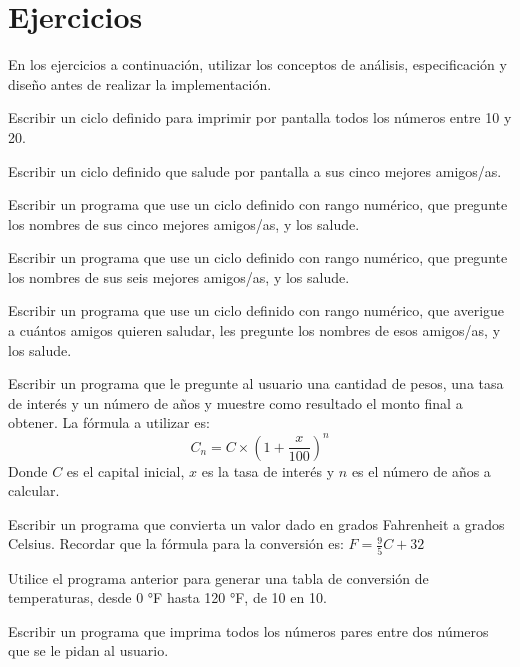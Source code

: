 \newpage
\section{Ejercicios}
En los ejercicios a continuación, utilizar los conceptos de análisis,
especificación y diseño antes de realizar la implementación.

\begin{partes}
	\item Escribir un ciclo definido para imprimir por pantalla
todos los números entre 10 y 20.
	\item Escribir un ciclo definido que salude por pantalla a
sus cinco mejores amigos/as.
	\item Escribir un programa que use un ciclo definido con
rango numérico, que pregunte los nombres de sus cinco mejores
amigos/as, y los salude.
	\item Escribir un programa que use un ciclo definido con
rango numérico, que pregunte los nombres de sus seis mejores
amigos/as, y los salude.
	\item Escribir un programa que use un ciclo definido con
rango numérico, que averigue a cuántos amigos quieren saludar, les
pregunte los nombres de esos amigos/as, y los salude.
\end{partes}

\begin{ejercicio}
Escribir un programa que le pregunte al usuario una cantidad de pesos,
una tasa de interés y un número de años y muestre como resultado el monto
final a obtener.  La fórmula a utilizar es:
\begin{displaymath}
C_n = C \times (1+\frac{x}{100})^n
\end{displaymath}
Donde $C$ es el capital inicial, $x$ es la tasa de interés y $n$ es el
número de años a calcular.
\end{ejercicio}

\begin{ejercicio}
Escribir un programa que convierta un valor dado en grados Fahrenheit a
grados Celsius.  Recordar que la fórmula para la conversión es:
$F = \frac{9}{5}C+32$
\end{ejercicio}

\begin{ejercicio}
Utilice el programa anterior para generar una tabla de conversión de
temperaturas, desde 0 °F hasta 120 °F, de 10 en 10.
\end{ejercicio}

\begin{ejercicio}
Escribir un programa que imprima todos los números pares entre dos números
que se le pidan al usuario.
\end{ejercicio}

